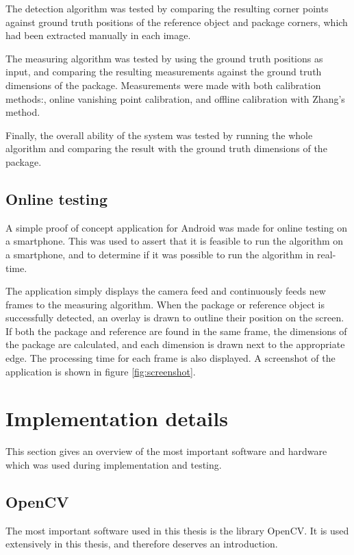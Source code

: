 The detection algorithm was tested by comparing the resulting corner points against ground truth positions of the reference object and package corners, which had been extracted manually in each image.

The measuring algorithm was tested by using the ground truth positions as input, and comparing the resulting measurements against the ground truth dimensions of the package.
Measurements were made with both calibration methods:, online vanishing point calibration, and offline calibration with Zhang's method. 

Finally, the overall ability of the system was tested by running the whole algorithm and comparing the result with the ground truth dimensions of the package. 

\subsection{Online testing} \label{method:online_testing}
A simple proof of concept application for Android was made for online testing on a smartphone.
This was used to assert that it is feasible to run the algorithm on a smartphone, and to determine if it was possible to run the algorithm in real-time.

The application simply displays the camera feed and continuously feeds new frames to the measuring algorithm.
When the package or reference object is successfully detected, an overlay is drawn to outline their position on the screen.
If both the package and reference are found in the same frame, the dimensions of the package are calculated, and each dimension is drawn next to the appropriate edge.
The processing time for each frame is also displayed.
A screenshot of the application is shown in figure \ref{fig:screenshot}.

\section{Implementation details}
This section gives an overview of the most important software and hardware which was used during implementation and testing.

\subsection{OpenCV}
The most important software used in this thesis is the library OpenCV.
It is used extensively in this thesis, and therefore deserves an introduction.

